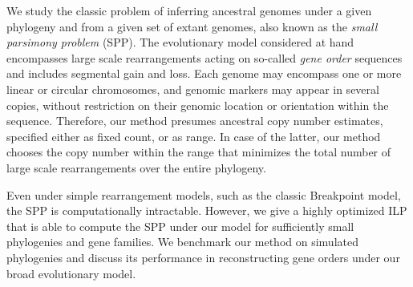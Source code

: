     We study the classic problem of inferring ancestral genomes under a given phylogeny and from a given set of extant genomes, also known as the \emph{small parsimony problem} (SPP).
    The evolutionary model considered at hand encompasses large scale rearrangements acting on so-called \emph{gene order} sequences and includes segmental gain and loss. Each genome may encompass one or more linear or circular chromosomes, and genomic markers may appear in several copies, without restriction on their genomic location or orientation within the sequence.
    Therefore, our method presumes ancestral copy number estimates, specified either as fixed count, or as range. 
    In case of the latter, our method chooses the copy number within the range that minimizes the total number of large scale rearrangements over the entire phylogeny. 
    
Even under simple rearrangement models, such as the classic Breakpoint model, the SPP is computationally intractable.
However, we give a highly optimized ILP that is able to compute the SPP under our model for sufficiently small phylogenies and gene families. We benchmark our method on simulated phylogenies and discuss its performance in reconstructing gene orders under our broad evolutionary model. 

